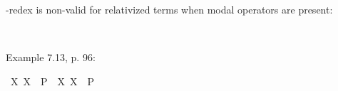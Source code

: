 \begin{isabellebody}
\begin{isamarkuptext}
\isa{{\isasymbeta}{\isasymeta}}-redex is non-valid for relativized terms when modal operators are present:%
\end{isamarkuptext}\isamarkuptrue%
\isamarkupfalse%
\ {\isachardoublequoteopen}{\isasymlfloor}{\isacharparenleft}{\isacharparenleft}{\isasymlambda}{\isasymalpha}{\isachardot}\ \isactrlbold {\isasymbox}{\isasymphi}\ {\isasymalpha}{\isacharparenright}\ \isactrlbold {\isasymdownharpoonleft}{\isacharparenleft}{\isasymtau}{\isacharcolon}{\isacharcolon}{\isasymup}{\isasymzero}{\isacharparenright}{\isacharparenright}\ \isactrlbold {\isasymleftrightarrow}\ {\isacharparenleft}\isactrlbold {\isasymbox}{\isasymphi}\ \isactrlbold {\isasymdownharpoonleft}{\isasymtau}{\isacharparenright}{\isasymrfloor}{\isachardoublequoteclose}\ \isamarkupfalse%
%
\isadelimproof
\ %
\endisadelimproof
%
\isatagproof
{}\isamarkupfalse%
\ \ \ %
%
\endisatagproof
{\isafoldproof}%
%
\isadelimproof
%
\endisadelimproof
\isanewline
{}\isamarkupfalse%
\ {\isachardoublequoteopen}{\isasymlfloor}{\isacharparenleft}{\isacharparenleft}{\isasymlambda}{\isasymalpha}{\isachardot}\ \isactrlbold {\isasymdiamond}{\isasymphi}\ {\isasymalpha}{\isacharparenright}\ \isactrlbold {\isasymdownharpoonleft}{\isacharparenleft}{\isasymtau}{\isacharcolon}{\isacharcolon}{\isasymup}{\isasymzero}{\isacharparenright}{\isacharparenright}\ \isactrlbold {\isasymleftrightarrow}\ {\isacharparenleft}\isactrlbold {\isasymdiamond}{\isasymphi}\ \isactrlbold {\isasymdownharpoonleft}{\isasymtau}{\isacharparenright}{\isasymrfloor}{\isachardoublequoteclose}\ \isamarkupfalse%
%
\isadelimproof
\ %
\endisadelimproof
%
\isatagproof
{}\isamarkupfalse%
\ \ \ %
%
\endisatagproof
{\isafoldproof}%
%
\isadelimproof
%
\endisadelimproof
%
\begin{isamarkuptext}%
Example 7.13, p. 96:%
\end{isamarkuptext}\isamarkuptrue%
\isamarkupfalse%
\ {\isachardoublequoteopen}{\isasymlfloor}{\isacharparenleft}{\isasymlambda}X{\isachardot}\ \isactrlbold {\isasymdiamond}\isactrlbold {\isasymexists}X{\isacharparenright}\ \ {\isacharparenleft}P{\isacharcolon}{\isacharcolon}{\isasymup}{\isasymlangle}{\isasymzero}{\isasymrangle}{\isacharparenright}\ \isactrlbold {\isasymrightarrow}\ \isactrlbold {\isasymdiamond}{\isacharparenleft}{\isacharparenleft}{\isasymlambda}X{\isachardot}\ \isactrlbold {\isasymexists}X{\isacharparenright}\ \ P{\isacharparenright}{\isasymrfloor}{\isachardoublequoteclose}%

\end{isabellebody}
